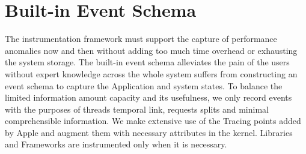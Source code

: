 \section{Built-in Event Schema}\label{section: builtin_event_schema}
The instrumentation framework must support the capture of performance anomalies now and then without adding too much time overhead or exhausting the system storage.
The built-in event schema alleviates the pain of the users without expert knowledge across the whole system suffers from constructing an event schema to capture the Application and system states.
To balance the limited information amount capacity and its usefulness, we only record events with the purposes of threads temporal link, requests splits and minimal comprehensible information.
We make extensive use of the Tracing points added by Apple and augment them with necessary attributes in the kernel.
Libraries and Frameworks are instrumented only when it is necessary.

